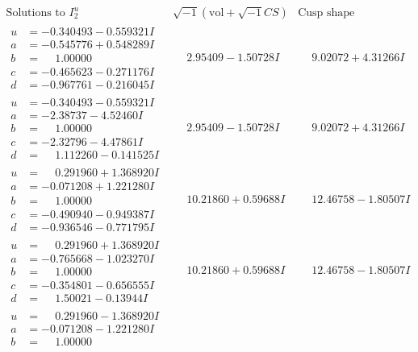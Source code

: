 \documentclass[1p]{elsarticle_modified}
\theoremstyle{definition}
\newcommand{\I}{\sqrt{-1}}
\begin{document}
$$\begin{array}{c|c|c}
\text{Solutions to }I^u_{2}& \I (\text{vol} + \sqrt{-1}CS) & \text{Cusp shape}\\
 \hline 
\begin{aligned}
u &= -0.340493 - 0.559321 I \\
a &= -0.545776 + 0.548289 I \\
b &= \phantom{-}1.00000\phantom{ +0.000000I} \\
c &= -0.465623 - 0.271176 I \\
d &= -0.967761 - 0.216045 I\end{aligned}
 & \phantom{-}2.95409 - 1.50728 I & \phantom{-}9.02072 + 4.31266 I \\ \hline\begin{aligned}
u &= -0.340493 - 0.559321 I \\
a &= -2.38737 - 4.52460 I \\
b &= \phantom{-}1.00000\phantom{ +0.000000I} \\
c &= -2.32796 - 4.47861 I \\
d &= \phantom{-}1.112260 - 0.141525 I\end{aligned}
 & \phantom{-}2.95409 - 1.50728 I & \phantom{-}9.02072 + 4.31266 I \\ \hline\begin{aligned}
u &= \phantom{-}0.291960 + 1.368920 I \\
a &= -0.071208 + 1.221280 I \\
b &= \phantom{-}1.00000\phantom{ +0.000000I} \\
c &= -0.490940 - 0.949387 I \\
d &= -0.936546 - 0.771795 I\end{aligned}
 & \phantom{-}10.21860 + 0.59688 I & \phantom{-}12.46758 - 1.80507 I \\ \hline\begin{aligned}
u &= \phantom{-}0.291960 + 1.368920 I \\
a &= -0.765668 - 1.023270 I \\
b &= \phantom{-}1.00000\phantom{ +0.000000I} \\
c &= -0.354801 - 0.656555 I \\
d &= \phantom{-}1.50021 - 0.13944 I\end{aligned}
 & \phantom{-}10.21860 + 0.59688 I & \phantom{-}12.46758 - 1.80507 I \\ \hline\begin{aligned}
u &= \phantom{-}0.291960 - 1.368920 I \\
a &= -0.071208 - 1.221280 I \\
b &= \phantom{-}1.00000\phantom{ +0.000000I} \\

\end{aligned}
\end{array}$$
\end{document}
